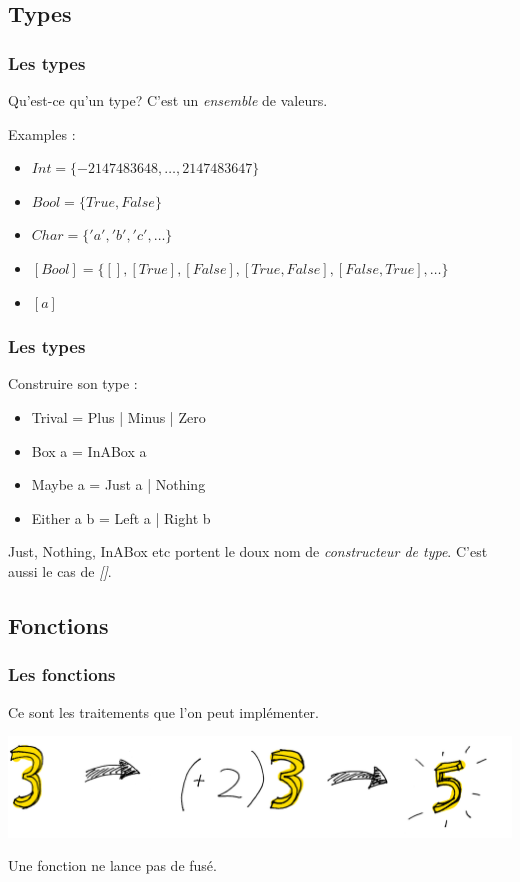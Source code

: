 \documentclass{beamer}
\begin{document}
\subsection{Types}
\begin{frame}
\frametitle{Les types}
\begin{block}{Qu'est-ce qu'un type?}
C'est un \emph{ensemble} de valeurs.
\end{block}
\pause
\begin{exampleblock}{Examples :}
\begin{itemize}
\item $Int = \{-2 147 483 648, \dots, 2 147 483 647\}$
\item $Bool = \{True, False\}$
\item $Char = \{'a', 'b', 'c' , \dots\}$
\pause
\item $[Bool] = \{[], [True], [False], [True, False], [False, True], \dots\}$
\pause
\item $[a]$
\end{itemize}

\end{exampleblock}
\end{frame}

\begin{frame}
\frametitle{Les types}
\begin{block}{Construire son type :}
\begin{itemize}
\item Trival = Plus | Minus | Zero
\pause
\item Box a = InABox a
\pause
\item Maybe a = Just a | Nothing
\pause
\item Either a b = Left a | Right b
\end{itemize}
\end{block}

\pause

Just, Nothing, InABox etc portent le doux nom de \emph{constructeur de type}. C'est aussi le cas de \emph{[]}.
\end{frame}

\subsection{Fonctions}
\begin{frame}
\frametitle{Les fonctions}
\begin{block}{}
Ce sont les traitements que l'on peut implémenter.
\end{block}
\begin{center}
\includegraphics[scale=0.2]{fct.png}
\end{center}
\pause
\begin{block}{}
Une fonction ne lance pas de fusé.
\end{block}
\end{frame}
\end{document}
